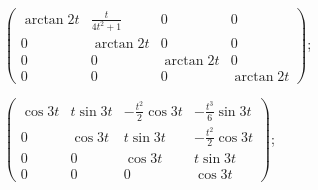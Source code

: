 \begin{enumsolsfull}
		\item \( \begin{pmatrix} \arctan{2t} & \frac{t}{4t^2 + 1} & 0 & 0 \\ 0 & \arctan{2t} & 0 & 0 \\ 0 & 0 & \arctan{2t} & 0 \\ 0 & 0 & 0 & \arctan{2t} \end{pmatrix} \); %
		\item \( \begin{pmatrix} \cos{3t} & t \sin{3t} & -\frac{t^2}{2} \cos{3t} & -\frac{t^3}{6} \sin{3t} \\ 0 & \cos{3t} & t \sin{3t} & -\frac{t^2}{2} \cos{3t} \\ 0 & 0 & \cos{3t} & t \sin{3t} \\ 0 & 0 & 0 & \cos{3t} \end{pmatrix} \); %

\end{enumsolsfull}

